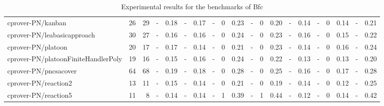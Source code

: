 \documentclass{article}
\newcommand{\bfc}{{\sc Bfc}}
\begin{document}
\begin{table}[h]
\begin{center}
\begin{tabular}{ | l | r | r | *{17}{ r | } }
    \hline
cprover-PN/kanban & 26 & 29 & - & 0.18 & - & 0.17 & - & 0 & 0.23 & - & 0 & 0.20 & - & 0.14 & - & 0 & 0.14 & - & 0.21 \\
cprover-PN/leabasicapproach & 30 & 27 & - & 0.16 & - & 0.16 & - & 0 & 0.24 & - & 0 & 0.23 & - & 0.16 & - & 0 & 0.15 & - & 0.22 \\
cprover-PN/platoon & 20 & 17 & - & 0.17 & - & 0.14 & - & 0 & 0.21 & - & 0 & 0.23 & - & 0.14 & - & 0 & 0.16 & - & 0.24 \\
cprover-PN/platoonFiniteHandlerPoly & 19 & 16 & - & 0.15 & - & 0.16 & - & 0 & 0.24 & - & 0 & 0.22 & - & 0.13 & - & 0 & 0.13 & - & 0.20 \\
cprover-PN/pncsacover & 64 & 68 & - & 0.19 & - & 0.18 & - & 0 & 0.28 & - & 0 & 0.25 & - & 0.16 & - & 0 & 0.17 & - & 0.28 \\
cprover-PN/reaction2 & 13 & 11 & - & 0.15 & - & 0.14 & - & 0 & 0.21 & - & 0 & 0.19 & - & 0.14 & - & 0 & 0.12 & - & 0.25 \\
cprover-PN/reaction5 & 11 & 8 & - & 0.14 & - & 0.14 & - & 1 & 0.39 & - & 1 & 0.44 & - & 0.12 & - & 0 & 0.14 & - & 0.42 \\
    \hline
  \end{tabular}
\end{center}
\caption{Experimental results for the benchmarks of \bfc}
\label{bfc-experiments}
\end{table}
\end{document}

